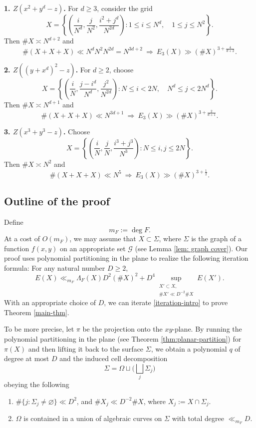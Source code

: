 \documentclass{amsart}%
\numberwithin{equation}{section}
\newcommand{\1}{\mathbbm{1}}
\begin{document}
\medskip 

{\bf 1. $Z(x^2+y^d-z)$.} For $d\ge 3$, consider the grid
\[
    X
    =
    \left\{
    \left(\frac{i}{N^d},
    \frac{j}{N^2},
    \frac{i^2+j^d}{N^{2d}}
    \right):
    1\le i\le N^d,\quad
    1\le j\le N^2
    \right\}.
\]
Then $\# X\asymp N^{d+2}$ and
\[
    \#(X+X+X)\ll N^dN^2N^{2d} = N^{3d+2}\ \Longrightarrow\ E_3(X)\gg (\#X)^{3+\frac{4}{d+2}}.
\] 

\medskip 

{\bf 2. $Z((y+x^d)^2-z)$.} 
For $d\ge 2$, choose
\[
    X=\left\{
    \left(
    \frac{i}{N},
    \frac{j-i^d}{N^d},
    \frac{j^2}{N^{2d}}
    \right) :N\leq i<2N,\quad N^d\leq j<2N^d \right\}.
\]
Then $\#X \asymp N^{d+1}$
and
\[
    \#(X+X+X)\ll  N^{3d+1}\ \Longrightarrow\ E_3(X)\gg (\#X)^{3+\frac{2}{d+1}}.
\]


 

\medskip

{\bf 3. $Z(x^3+y^3-z)$.} Choose
\[
    X = \left\{
    \left(
    \frac{i}{N},
    \frac{j}{N},
    \frac{i^3+j^3}{N^3}
    \right):
    N  \leq i,j\leq 2N \right\}.
\]
Then $\# X\asymp N^2$ and
\[
    \#(X+X+X)\ll N^5\ \Longrightarrow\ E_3(X)\gg (\#X)^{3+\frac{1}{2}}.
\]


\bigskip 

\subsection{Outline of the proof}
Define 
\[
    m_F:=\deg F.
\]
At a cost of $O(m_F)$, we may assume that $X\subset \Sigma$, where $\Sigma$ is the graph of a function $f(x,y)$ on an appropriate set $\mathcal G$ (see Lemma \ref{lem: graph cover}).
Our proof uses polynomial partitioning in the plane to realize the following iteration formula: 
For any natural number $D\geq2$, 
\begin{equation}
\label{iteration-intro}
    E(X)\ll_{m_F} \Lambda_{F}(X)D^2(\#X)^2+D^4\sup_{\substack{X'\subset X,\\
    \#X'\ll D^{-2}\#X}}E(X').
\end{equation}
With an appropriate choice of $D$, we can iterate \eqref{iteration-intro} to prove Theorem \ref{main-thm}.

\smallskip


To be more precise, let $\pi$ be the projection onto the $xy$-plane.
By running the polynomial partitioning in the plane (see Theorem \ref{thm:planar-partition}) for $\pi(X)$ and then lifting it back to the surface $\Sigma$, we obtain a polynomial $q$ of degree at most $D$ and the induced cell decomposition
\[
    \Sigma=\Omega\sqcup\big(\bigsqcup_j\Sigma_j\big)
\]
obeying the following
\begin{enumerate}
    \item $\#\{j: \Sigma_j\not=\varnothing\}\ll D^2$, and $\#X_j\ll D^{-2}\#X$, where $X_j:=X\cap \Sigma_j$.
    \item $\Omega$ is contained in a union of algebraic curves on $\Sigma$ with total degree $\ll_{m_F}D$.
\end{enumerate}
\end{document}
